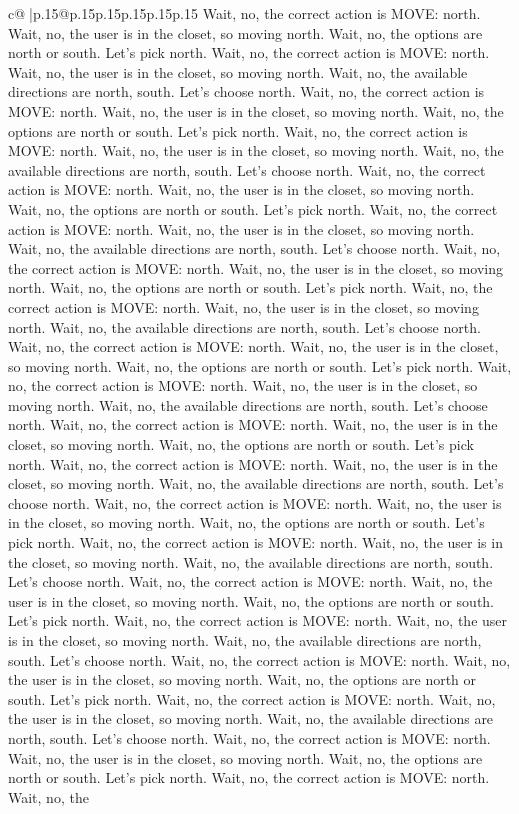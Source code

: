 \documentclass{article}
\begin{document}
{\begin{supertabular}{c@{$\;$}|p{.15\linewidth}@{}p{.15\linewidth}p{.15\linewidth}p{.15\linewidth}p{.15\linewidth}p{.15\linewidth}}
{{{Wait, no, the correct action is MOVE: north. Wait, no, the user is in the closet, so moving north. Wait, no, the options are north or south. Let's pick north. Wait, no, the correct action is MOVE: north. Wait, no, the user is in the closet, so moving north. Wait, no, the available directions are north, south. Let's choose north. Wait, no, the correct action is MOVE: north. Wait, no, the user is in the closet, so moving north. Wait, no, the options are north or south. Let's pick north. Wait, no, the correct action is MOVE: north. Wait, no, the user is in the closet, so moving north. Wait, no, the available directions are north, south. Let's choose north. Wait, no, the correct action is MOVE: north. Wait, no, the user is in the closet, so moving north. Wait, no, the options are north or south. Let's pick north. Wait, no, the correct action is MOVE: north. Wait, no, the user is in the closet, so moving north. Wait, no, the available directions are north, south. Let's choose north. Wait, no, the correct action is MOVE: north. Wait, no, the user is in the closet, so moving north. Wait, no, the options are north or south. Let's pick north. Wait, no, the correct action is MOVE: north. Wait, no, the user is in the closet, so moving north. Wait, no, the available directions are north, south. Let's choose north. Wait, no, the correct action is MOVE: north. Wait, no, the user is in the closet, so moving north. Wait, no, the options are north or south. Let's pick north. Wait, no, the correct action is MOVE: north. Wait, no, the user is in the closet, so moving north. Wait, no, the available directions are north, south. Let's choose north. Wait, no, the correct action is MOVE: north. Wait, no, the user is in the closet, so moving north. Wait, no, the options are north or south. Let's pick north. Wait, no, the correct action is MOVE: north. Wait, no, the user is in the closet, so moving north. Wait, no, the available directions are north, south. Let's choose north. Wait, no, the correct action is MOVE: north. Wait, no, the user is in the closet, so moving north. Wait, no, the options are north or south. Let's pick north. Wait, no, the correct action is MOVE: north. Wait, no, the user is in the closet, so moving north. Wait, no, the available directions are north, south. Let's choose north. Wait, no, the correct action is MOVE: north. Wait, no, the user is in the closet, so moving north. Wait, no, the options are north or south. Let's pick north. Wait, no, the correct action is MOVE: north. Wait, no, the user is in the closet, so moving north. Wait, no, the available directions are north, south. Let's choose north. Wait, no, the correct action is MOVE: north. Wait, no, the user is in the closet, so moving north. Wait, no, the options are north or south. Let's pick north. Wait, no, the correct action is MOVE: north. Wait, no, the user is in the closet, so moving north. Wait, no, the available directions are north, south. Let's choose north. Wait, no, the correct action is MOVE: north. Wait, no, the user is in the closet, so moving north. Wait, no, the options are north or south. Let's pick north. Wait, no, the correct action is MOVE: north. Wait, no, the }}}
\end{supertabular}}
\end{document}
